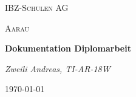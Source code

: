 \begin{titlepage}
    \centering
    {\scshape\LARGE IBZ-Schulen AG\par}
    {\scshape\Large Aarau\par}
    \vspace{1.5cm}
    {\huge\bfseries Dokumentation Diplomarbeit\par}
    \vspace{2cm}
    {\Large\itshape Zweili Andreas, TI-AR-18W\par}
    \vfill

    {\large \today\par}
\thispagestyle{empty}
\end{titlepage}
